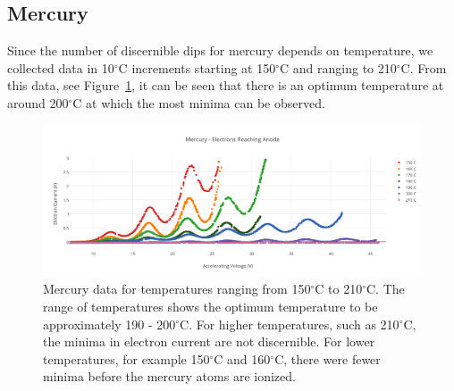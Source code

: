 \documentclass[prb,preprint]{revtex4-1}
\begin{document}
\subsection{Mercury}

Since the number of discernible dips for mercury depends on temperature, we collected data in 10$^{\circ}$C increments starting at 150$^{\circ}$C and ranging to 210$^{\circ}$C. From this data, see Figure~\ref{hg_data}, it can be seen that there is an optimum temperature at around 200$^{\circ}$C at which the most minima can be observed. 

\begin{figure}[h!]
\centering

\includegraphics[width=6in]{hg_data.pdf}
\caption{Mercury data for temperatures ranging from 150$^{\circ}$C to 210$^{\circ}$C. The range of temperatures shows the optimum temperature to be approximately 190 - 200$^{\circ}$C. For higher temperatures, such as 210$^{\circ}$C, the minima in electron current are not discernible. For lower temperatures, for example 150$^{\circ}$C and 160$^{\circ}$C, there were fewer minima before the mercury atoms are ionized.}

\label{hg_data}
\end{figure}
\end{document}
